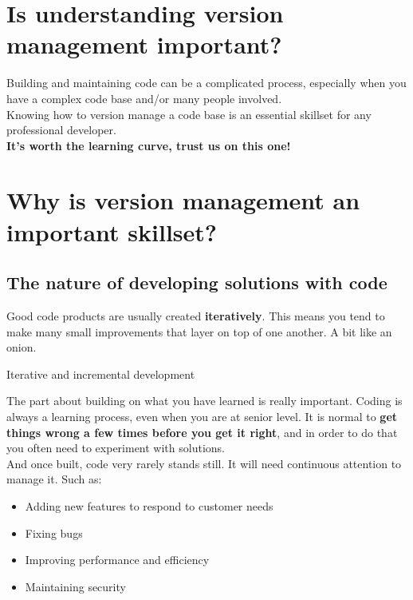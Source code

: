 \section{Is understanding version management important?}

Building and maintaining code can be a complicated process, especially when you have a complex code base and/or many people involved.
\\

Knowing how to version manage a code base is an essential skillset for any professional developer. 
\\

\textbf{It's worth the learning curve, trust us on this one!}


\section{Why is version management an important skillset?}
\subsection{The nature of developing solutions with code}

Good code products are usually created \textbf{iteratively}. This means you tend to make many small improvements that layer on top of one another. A bit like an onion.

\pagebreak

\begin{infobox}{Iterative and incremental development}
\end{infobox}

The part about building on what you have learned is really important. Coding is always a learning process, even when you are at senior level. It is normal to \textbf{get things wrong a few times before you get it right}, and in order to do that you often need to experiment with solutions.
\\

And once built, code very rarely stands still. It will need continuous attention to manage it. Such as:

\begin{itemize}
    \item Adding new features to respond to customer needs
    \item Fixing bugs
    \item Improving performance and efficiency
    \item Maintaining security
\end{itemize}

